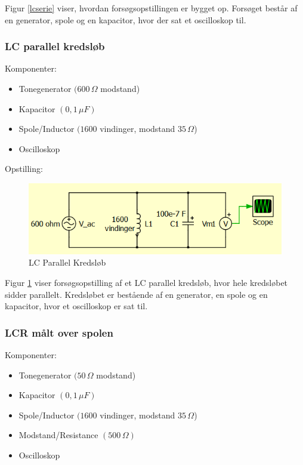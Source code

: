 Figur \ref{lcserie} viser, hvordan forsøgsopstillingen er bygget op. Forsøget består af en generator, spole og en kapacitor, hvor der sat et oscilloskop til.

\subsubsection{LC parallel kredsløb}

Komponenter:

\begin{itemize}
\item Tonegenerator $(600\, \Omega$ modstand)
\item Kapacitor $( 0,1\, \mu F)$
\item Spole/Inductor $(1600$ vindinger, modstand $35 \, \Omega$)
\item Oscilloskop
\end{itemize}

Opstilling:

\begin{figure}[H]
\centering
\includegraphics[scale=1.25]{Vildledning/Schematics/Kredslb/LC_Parallel}
\caption{LC Parallel Kredsløb}
\label{lcparallel}
\end{figure}

Figur \ref{lcparallel} viser forsøgsopstilling af et LC parallel kredsløb, hvor hele kredsløbet sidder parallelt. Kredsløbet er bestående af en generator, en spole og en kapacitor, hvor et oscilloskop er sat til.

\subsubsection{LCR målt over spolen}

Komponenter:

\begin{itemize}
\item Tonegenerator $(50\, \Omega$ modstand)
\item Kapacitor $( 0,1\, \mu F)$
\item Spole/Inductor $(1600$ vindinger, modstand $35 \, \Omega$)
\item Modstand/Resistance $(500\, \Omega)$
\item Oscilloskop
\end{itemize}

